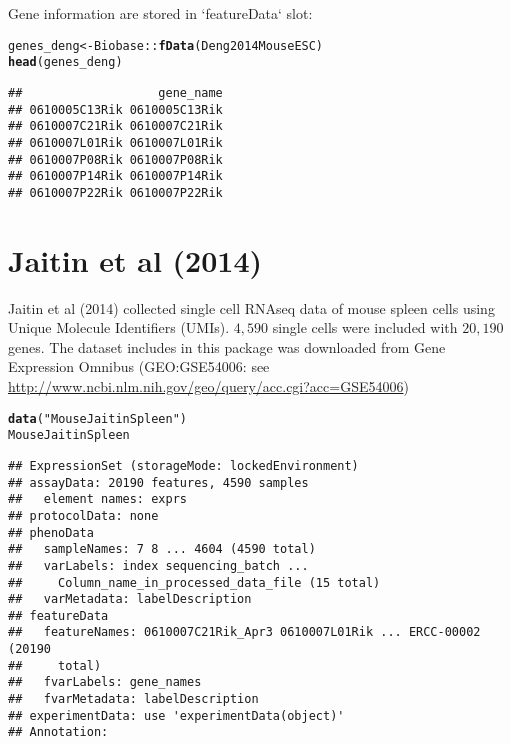 \documentclass[12pt]{article}\usepackage[]{graphicx}\usepackage[usenames,dvipsnames]{color}
\makeatletter
\newcommand{\hlstr}[1]{\textcolor[rgb]{0.192,0.494,0.8}{#1}}%
\newcommand{\hlopt}[1]{\textcolor[rgb]{0,0,0}{#1}}%
\newcommand{\hlstd}[1]{\textcolor[rgb]{0.345,0.345,0.345}{#1}}%
\newcommand{\hlkwb}[1]{\textcolor[rgb]{0.69,0.353,0.396}{#1}}%
\newcommand{\hlkwd}[1]{\textcolor[rgb]{0.737,0.353,0.396}{\textbf{#1}}}%
\newenvironment{kframe}{%
 \def\at@end@of@kframe{}%
 \ifinner\ifhmode%
  \def\at@end@of@kframe{\end{minipage}}%
  \begin{minipage}{\columnwidth}%
 \fi\fi%
 \def\FrameCommand##1{\hskip\@totalleftmargin \hskip-\fboxsep
 \colorbox{shadecolor}{##1}\hskip-\fboxsep
     \hskip-\linewidth \hskip-\@totalleftmargin \hskip\columnwidth}%
 \MakeFramed {\advance\hsize-\width
   \@totalleftmargin\z@ \linewidth\hsize
   \@setminipage}}%
 {\par\unskip\endMakeFramed%
 \at@end@of@kframe}
\newenvironment{knitrout}{}{} %
\makeatother
\begin{document}
Gene information are stored in `featureData` slot:

\begin{knitrout}
\color{fgcolor}\begin{kframe}
\begin{alltt}
\hlstd{genes_deng} \hlkwb{<-} \hlstd{Biobase}\hlopt{::}\hlkwd{fData}\hlstd{(Deng2014MouseESC)}
\hlkwd{head}\hlstd{(genes_deng)}
\end{alltt}
\begin{verbatim}
##                   gene_name
## 0610005C13Rik 0610005C13Rik
## 0610007C21Rik 0610007C21Rik
## 0610007L01Rik 0610007L01Rik
## 0610007P08Rik 0610007P08Rik
## 0610007P14Rik 0610007P14Rik
## 0610007P22Rik 0610007P22Rik
\end{verbatim}
\end{kframe}
\end{knitrout}


\section{Jaitin et al (2014)}

Jaitin et al (2014) \cite{Jaitin2014} collected single cell RNAseq data of mouse spleen cells using Unique Molecule Identifiers (UMIs). $4,590$ single cells were included with $20,190$ genes. The dataset includes in this package was downloaded from Gene Expression Omnibus (GEO:GSE54006: see
\url{http://www.ncbi.nlm.nih.gov/geo/query/acc.cgi?acc=GSE54006})


\begin{knitrout}
\color{fgcolor}\begin{kframe}
\begin{alltt}
\hlkwd{data}\hlstd{(}\hlstr{"MouseJaitinSpleen"}\hlstd{)}
\hlstd{MouseJaitinSpleen}
\end{alltt}
\begin{verbatim}
## ExpressionSet (storageMode: lockedEnvironment)
## assayData: 20190 features, 4590 samples 
##   element names: exprs 
## protocolData: none
## phenoData
##   sampleNames: 7 8 ... 4604 (4590 total)
##   varLabels: index sequencing_batch ...
##     Column_name_in_processed_data_file (15 total)
##   varMetadata: labelDescription
## featureData
##   featureNames: 0610007C21Rik_Apr3 0610007L01Rik ... ERCC-00002 (20190
##     total)
##   fvarLabels: gene_names
##   fvarMetadata: labelDescription
## experimentData: use 'experimentData(object)'
## Annotation:
\end{verbatim}
\end{kframe}
\end{knitrout}
\end{document}
